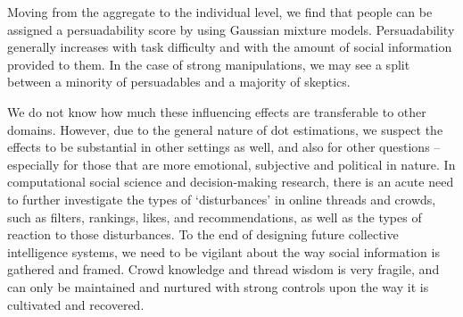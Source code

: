 \documentclass[9pt,twocolumn,twoside,lineno]{pnas-new}
\begin{document}
Moving from the aggregate to the individual level, we find that people can be assigned a persuadability score by using Gaussian mixture models. Persuadability generally increases with task difficulty and with the amount of social information provided to them. In the case of strong manipulations, we may see a split between a minority of persuadables and a majority of skeptics.

We do not know how much these influencing effects are transferable to other domains. However, due to the general nature of dot estimations, we suspect the effects to be substantial in other settings as well, and also for other questions – especially for those that are more emotional, subjective and political in nature. In computational social science and decision-making research,  there is an acute need to further investigate the types of ‘disturbances’ in online threads and crowds, such as filters, rankings, likes, and recommendations, as well as the types of reaction to those disturbances. To the end of designing future collective intelligence systems, we need to be vigilant about the way social information is gathered and framed. Crowd knowledge and thread wisdom is very fragile, and can only be maintained and nurtured with strong controls upon the way it is cultivated and recovered.
\end{document}
